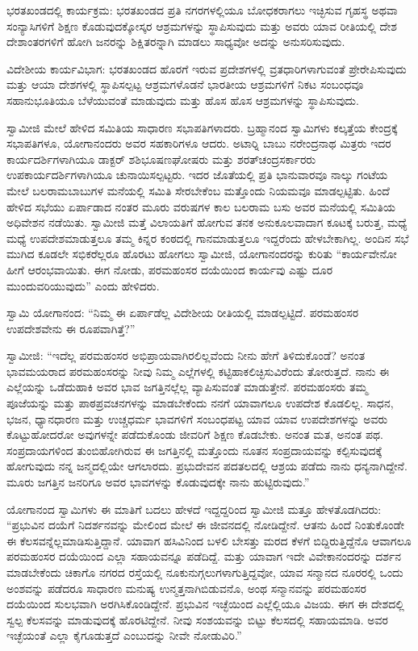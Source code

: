  ಭರತಖಂಡದಲ್ಲಿ ಕಾರ್ಯಕ್ರಮ: ಭರತಖಂಡದ ಪ್ರತಿ ನಗರಗಳಲ್ಲಿಯೂ ಬೋಧಕರಾಗಲು ಇಚ್ಛಿಸುವ ಗೃಹಸ್ಥ ಅಥವಾ ಸಂನ್ಯಾಸಿಗಳಿಗೆ ಶಿಕ್ಷಣ ಕೊಡುವುದಕ್ಕೋಸ್ಕರ ಆಶ್ರಮಗಳನ್ನು ಸ್ಥಾಪಿಸುವುದು ಮತ್ತು ಅವರು ಯಾವ ರೀತಿಯಲ್ಲಿ ದೇಶ ದೇಶಾಂತರಗಳಿಗೆ ಹೋಗಿ ಜನರನ್ನು ಶಿಕ್ಷಿತರನ್ನಾಗಿ ಮಾಡಲು ಸಾಧ್ಯವೋ ಅದನ್ನು ಅನುಸರಿಸುವುದು. 

 ವಿದೇಶೀಯ ಕಾರ್ಯವಿಭಾಗ: ಭರತಖಂಡದ ಹೊರಗೆ ಇರುವ ಪ್ರದೇಶಗಳಲ್ಲಿ ವ್ರತಧಾರಿಗಳಾಗುವಂತೆ ಪ್ರೇರೇಪಿಸುವುದು ಮತ್ತು ಆಯಾ ದೇಶಗಳಲ್ಲಿ ಸ್ಥಾಪಿಸಲ್ಪಟ್ಟ ಆಶ್ರಮಗಳೊಡನೆ ಭಾರತೀಯ ಆಶ್ರಮಗಳಿಗೆ ನಿಕಟ ಸಂಬಂಧವೂ ಸಹಾನುಭೂತಿಯೂ ಬೆಳೆಯುವಂತೆ ಮಾಡುವುದು ಮತ್ತು ಹೊಸ ಹೊಸ ಆಶ್ರಮಗಳನ್ನು ಸ್ಥಾಪಿಸುವುದು. 

 ಸ್ವಾಮೀಜಿ ಮೇಲೆ ಹೇಳಿದ ಸಮಿತಿಯ ಸಾಧಾರಣ ಸಭಾಪತಿಗಳಾದರು. ಬ್ರಹ್ಮಾನಂದ ಸ್ವಾಮಿಗಳು ಕಲ್ಕತ್ತೆಯ ಕೇಂದ್ರಕ್ಕೆ ಸಭಾಪತಿಗಳೂ, ಯೋಗಾನಂದರು ಅವರ ಸಹಕಾರಿಗಳೂ ಆದರು. ಅಟಾರ‍್ನಿ ಬಾಬು ನರೇಂದ್ರನಾಥ ಮಿತ್ರರು ಇದರ ಕಾರ್ಯದರ್ಶಿಗಳಾಗಿಯೂ ಡಾಕ್ಟರ್ ಶಶಿಭೂಷಣಘೋಷರು ಮತ್ತು ಶರತ್‍ಚಂದ್ರಸರ್ಕಾರರು ಉಪಕಾರ್ಯದರ್ಶಿಗಳಾಗಿಯೂ ಚುನಾಯಿಸಲ್ಪಟ್ಟರು. ಇದರ ಜೊತೆಯಲ್ಲಿ ಪ್ರತಿ ಭಾನುವಾರವೂ ನಾಲ್ಕು ಗಂಟೆಯ ಮೇಲೆ ಬಲರಾಮಬಾಬುಗಳ ಮನೆಯಲ್ಲಿ ಸಮಿತಿ ಸೇರಬೇಕೆಂಬ ಮತ್ತೊಂದು ನಿಯಮವೂ ಮಾಡಲ್ಪಟ್ಟಿತು. ಹಿಂದೆ ಹೇಳಿದ ಸಭೆಯು ಏರ್ಪಾಡಾದ ನಂತರ ಮೂರು ವರುಷಗಳ ಕಾಲ ಬಲರಾಮ ಬಸು ಅವರ ಮನೆಯಲ್ಲಿ ಸಮಿತಿಯ ಅಧಿವೇಶನ ನಡೆಯಿತು. ಸ್ವಾಮೀಜಿ ಮತ್ತೆ ವಿಲಾಯತಿಗೆ ಹೋಗುವ ತನಕ ಅನುಕೂಲವಾದಾಗ ಕೂಟಕ್ಕೆ ಬರುತ್ತ, ಮಧ್ಯೆ ಮಧ್ಯೆ ಉಪದೇಶಮಾಡುತ್ತಲೂ ತಮ್ಮ ಕಿನ್ನರ ಕಂಠದಲ್ಲಿ ಗಾನಮಾಡುತ್ತಲೂ ಇದ್ದರೆಂದು ಹೇಳಬೇಕಾಗಿಲ್ಲ. ಅಂದಿನ ಸಭೆ ಮುಗಿದ ಕೂಡಲೇ ಸಭಿಕರೆಲ್ಲರೂ ಹೊರಟು ಹೋಗಲು ಸ್ವಾಮೀಜಿ, ಯೋಗಾನಂದರನ್ನು ಕುರಿತು “ಕಾರ್ಯವೇನೋ ಹೀಗೆ ಆರಂಭವಾಯಿತು. ಈಗ ನೋಡು, ಪರಮಹಂಸರ ದಯೆಯಿಂದ ಕಾರ್ಯವು ಎಷ್ಟು ದೂರ ಮುಂದುವರಿಯುವುದು” ಎಂದು ಹೇಳಿದರು. 

 ಸ್ವಾಮಿ ಯೋಗಾನಂದ: “ನಿಮ್ಮ ಈ ಏರ್ಪಾಡೆಲ್ಲ ವಿದೇಶೀಯ ರೀತಿಯಲ್ಲಿ ಮಾಡಲ್ಪಟ್ಟಿದೆ. ಪರಮಹಂಸರ ಉಪದೇಶವೇನು ಈ ರೂಪವಾಗಿತ್ತೆ?” 

 ಸ್ವಾಮೀಜಿ: “ಇದೆಲ್ಲ ಪರಮಹಂಸರ ಅಭಿಪ್ರಾಯವಾಗಿರಲಿಲ್ಲವೆಂದು ನೀನು ಹೇಗೆ ತಿಳಿದುಕೊಂಡೆ? ಅನಂತ ಭಾವಮಯರಾದ ಪರಮಹಂಸರನ್ನು ನೀವು ನಿಮ್ಮ ಎಲ್ಲೆಗಳಲ್ಲಿ ಕಟ್ಟಿಹಾಕಲಿಚ್ಛಿಸುವಿರೆಂದು ತೋರುತ್ತದೆ. ನಾನು ಈ ಎಲ್ಲೆಯನ್ನು ಒಡೆದುಹಾಕಿ ಅವರ ಭಾವ ಜಗತ್ತಿನಲ್ಲೆಲ್ಲ ವ್ಯಾಪಿಸುವಂತೆ ಮಾಡುತ್ತೇನೆ. ಪರಮಹಂಸರು ತಮ್ಮ ಪೂಜೆಯನ್ನು ಮತ್ತು ಪಾಠಪ್ರವಚನಗಳನ್ನು ಮಾಡಬೇಕೆಂದು ನನಗೆ ಯಾವಾಗಲೂ ಉಪದೇಶ ಕೊಡಲಿಲ್ಲ. ಸಾಧನ, ಭಜನ, ಧ್ಯಾನಧಾರಣ ಮತ್ತು ಉಚ್ಚಧರ್ಮ ಭಾವಗಳಿಗೆ ಸಂಬಂಧಪಟ್ಟ ಯಾವ ಯಾವ ಉಪದೇಶಗಳನ್ನು ಅವರು ಕೊಟ್ಟುಹೋದರೋ ಅವುಗಳನ್ನೇ ಪಡೆದುಕೊಂಡು ಜೀವರಿಗೆ ಶಿಕ್ಷಣ ಕೊಡಬೇಕು. ಅನಂತ ಮತ, ಅನಂತ ಪಥ. ಸಂಪ್ರದಾಯಗಳಿಂದ ತುಂಬಿಹೋಗಿರುವ ಈ ಜಗತ್ತಿನಲ್ಲಿ ಮತ್ತೊಂದು ನೂತನ ಸಂಪ್ರದಾಯವನ್ನು ಕಲ್ಪಿಸುವುದಕ್ಕೆ ಹೋಗುವುದು ನನ್ನ ಜನ್ಮದಲ್ಲಿಯೇ ಆಗಲಾರದು. ಪ್ರಭುದೇವನ ಪದತಲದಲ್ಲಿ ಆಶ್ರಯ ಪಡೆದು ನಾನು ಧನ್ಯನಾಗಿದ್ದೇನೆ. ಮೂರು ಜಗತ್ತಿನ ಜನರಿಗೂ ಅವರ ಭಾವಗಳನ್ನು ಕೊಡುವುದಕ್ಕೇ ನಾನು ಹುಟ್ಟಿರುವುದು.” 

 ಯೋಗಾನಂದ ಸ್ವಾಮಿಗಳು ಈ ಮಾತಿಗೆ ಬದಲು ಹೇಳದೆ ಇದ್ದದ್ದರಿಂದ ಸ್ವಾಮೀಜಿ ಮತ್ತೂ ಹೇಳತೊಡಗಿದರು: “ಪ್ರಭುವಿನ ದಯೆಗೆ ನಿದರ್ಶನವನ್ನು ಮೇಲಿಂದ ಮೇಲೆ ಈ ಜೀವನದಲ್ಲಿ ನೋಡಿದ್ದೇನೆ. ಆತನು ಹಿಂದೆ ನಿಂತುಕೊಂಡೇ ಈ ಕೆಲಸವನ್ನೆಲ್ಲ\break ಮಾಡಿಸುತ್ತಿದ್ದಾನೆ. ಯಾವಾಗ ಹಸಿವಿನಿಂದ ಬಳಲಿ ಬೇಸತ್ತು ಮರದ ಕೆಳಗೆ ಬಿದ್ದಿರುತ್ತಿದ್ದೆನೊ ಆವಾಗಲೂ ಪರಮಹಂಸರ ದಯೆಯಿಂದ ಎಲ್ಲಾ ಸಹಾಯವನ್ನೂ ಪಡೆದಿದ್ದೆ. ಮತ್ತು ಯಾವಾಗ ಇದೇ ವಿವೇಕಾನಂದರನ್ನು ದರ್ಶನ ಮಾಡಬೇಕೆಂದು ಚಿಕಾಗೊ ನಗರದ ರಸ್ತೆಯಲ್ಲಿ ನೂಕುನುಗ್ಗಲುಗಳಾಗುತ್ತಿದ್ದವೋ, ಯಾವ ಸನ್ಮಾನದ ನೂರರಲ್ಲಿ ಒಂದು ಅಂಶವನ್ನು ಪಡೆದರೂ ಸಾಧಾರಣ ಮನುಷ್ಯ ಉನ್ಮತ್ತನಾಗಿಬಿಡುವನೊ, ಅಂಥ ಸನ್ಮಾನವನ್ನು ಪರಮಹಂಸರ ದಯೆಯಿಂದ ಸುಲಭವಾಗಿ ಅರಗಿಸಿಕೊಂಡಿದ್ದೇನೆ. ಪ್ರಭುವಿನ ಇಚ್ಛೆಯಿಂದ ಎಲ್ಲೆಲ್ಲಿಯೂ ವಿಜಯ. ಈಗ ಈ ದೇಶದಲ್ಲಿ ಸ್ವಲ್ಪ ಕೆಲಸವನ್ನು ಮಾಡುವುದಕ್ಕೆ ಹೊರಟಿದ್ದೇನೆ. ನೀವು ಸಂಶಯವನ್ನು ಬಿಟ್ಟು ಕೆಲಸದಲ್ಲಿ ಸಹಾಯಮಾಡಿ. ಅವರ ಇಚ್ಛೆಯಂತೆ ಎಲ್ಲಾ ಕೈಗೂಡುತ್ತದೆ ಎಂಬುದನ್ನು ನೀವೇ ನೋಡುವಿರಿ.” 

